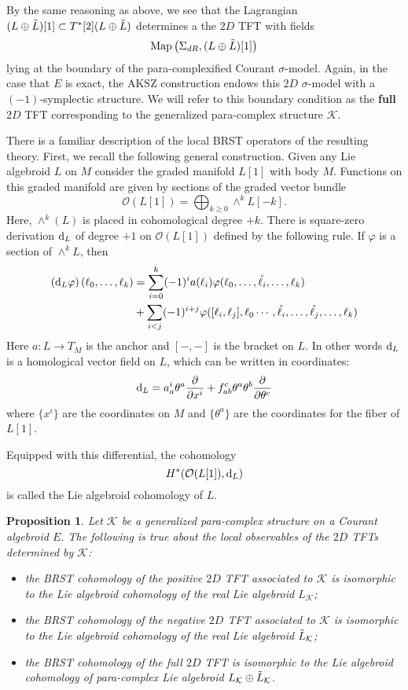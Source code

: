 \documentclass[letterpaper,12pt]{article}
\newcommand{\KK}{\mathcal{K}}
\newcommand{\cO}{\mathcal{O}}
\def\d{{\rm d}}
\newtheorem{proposition}[theorem]{Proposition}
\theoremstyle{definition}
\theoremstyle{remark}
\theoremstyle{examples}
\begin{document}
By the same reasoning as above, we see that the Lagrangian $(L \oplus \Tilde{L})[1] \subset T^*[2] (L \oplus \Tilde{L})$ determines a the $2D$ TFT with fields
\[
{\rm Map} \left(\Sigma_{dR}, (L \oplus \Tilde{L})[1]\right)
\]
lying at the boundary of the para-complexified Courant $\sigma$-model. 
Again, in the case that $E$ is exact, the AKSZ construction endows this $2D$ $\sigma$-model with a $(-1)$-symplectic structure. 
We will refer to this boundary condition as the {\bf full} $2D$ TFT corresponding to the generalized para-complex structure $\KK$. 

There is a familiar description of the local BRST operators of the resulting theory.
First, we recall the following general construction.
Given any Lie algebroid $L$ on $M$ consider the graded manifold $L[1]$ with body $M$. 
Functions on this graded manifold are given by sections of the graded vector bundle
\[
\cO(L[1]) = \bigoplus_{k \geq 0} \wedge^k L [-k] .
\]
Here, $\wedge^k(L)$ is placed in cohomological degree $+k$. 
There is square-zero derivation $\d_L$ of degree $+1$ on $\cO(L[1])$ defined by the following rule. 
If $\varphi$ is a section of $\wedge^k L$, then
\begin{align*}
\left( \d_L \varphi \right) (\ell_0, \ldots, \ell_k) & = \sum_{i = 0}^k (-1)^i a (\ell_i) \varphi(\ell_0, \ldots, \Hat{\ell_i}, \ldots, \ell_k) \\ & + \sum_{i < j} (-1)^{i+j} \varphi([\ell_i, \ell_j] , \ell_0 \cdots, \Hat{\ell_i}, \ldots, \Hat{\ell_j}, \ldots, \ell_k)
\end{align*}
Here $a : L \to T_M$ is the anchor and $[-,-]$ is the bracket on $L$. 
In other words $\d_L$ is a homological vector field on $L$, which can be written in coordinates:
\[
\d_L = a_a^i \theta^a \frac{\partial}{\partial x^i} + f_{ab}^c \theta^a \theta^b \frac{\partial}{\partial \theta^c}
\]
where $\{x^i\}$ are the coordinates on $M$ and $\{\theta^a\}$ are the coordinates for the fiber of $L[1]$.

Equipped with this differential, the cohomology
\[
H^*( \cO(L[1]), \d_L )
\]
is called the Lie algebroid cohomology of $L$.

\begin{proposition}
Let $\KK$ be a generalized para-complex structure on a Courant algebroid $E$.
The following is true about the local observables of the $2D$ TFTs determined by $\KK$:
\begin{itemize}
\item[(1)] the BRST cohomology of the positive $2D$ TFT associated to $\KK$ is isomorphic to the Lie algebroid cohomology of the real Lie algebroid $L_{\KK}$; 
\item[(2)] the BRST cohomology of the negative $2D$ TFT associated to $\KK$ is isomorphic to the Lie algebroid cohomology of the real Lie algebroid $\Tilde{L}_{\KK}$;
\item[(3)] the BRST cohomology of the full $2D$ TFT is isomorphic to the Lie algebroid cohomology of para-complex Lie algebroid $L_{\KK} \oplus \Tilde{L}_{\KK}$.
 \end{itemize}
\end{proposition}
\end{document}
